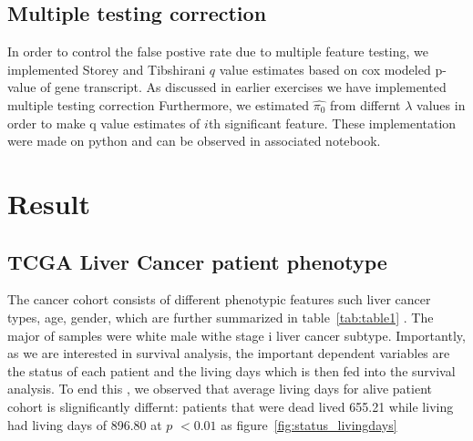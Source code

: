\documentclass{article}
\begin{document}
	\subsection {Multiple testing correction}
	In order to control the false postive rate due to multiple feature testing, we implemented Storey and Tibshirani \cite{storey2003statistical} $q$ value estimates based on cox modeled p-value of gene transcript. As discussed in earlier exercises we have  implemented multiple testing correction Furthermore, we estimated $\hat {\pi_0}$ from differnt $\lambda$ values in order to make q value estimates  of $i$th significant feature. These implementation were made on python and can be observed in associated notebook.

\section{Result}

\subsection {TCGA Liver Cancer patient phenotype}
 
The cancer cohort consists of different phenotypic features such liver cancer types, age, gender, which are further summarized in table~\ref{tab:table1} . The major of samples were white male withe stage i liver cancer subtype. Importantly, as we are interested in survival analysis, the  important dependent variables are the status of each patient  and the  living days which is then fed into the survival analysis. To end this , we observed that average living days for alive  patient cohort is slignificantly differnt: patients that were dead lived  655.21 while living had living days of 896.80 at $p$ $< 0.01$ as figure~\ref{fig:status_livingdays}
 
\end{document}
